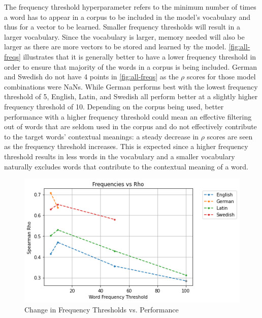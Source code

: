 The frequency threshold hyperparameter refers to the minimum number of times a word has to appear in a corpus to be included in the model’s vocabulary and thus for a vector to be learned. Smaller frequency thresholds will result in a larger vocabulary. Since the vocabulary is larger, memory needed will also be larger as there are more vectors to be stored and learned by the model.  \autoref{fig:all-freqs} illustrates that it is generally better to have a lower frequency threshold in order to ensure that majority of the words in a corpus is being included. German and Swedish do not have 4 points in \autoref{fig:all-freqs} as the $\rho$ scores for those model combinations were NaNs. While German performs best with the lowest frequency threshold of 5, English, Latin, and Swedish all perform better at a slightly higher frequency threshold of 10. Depending on the corpus being used, better performance with a higher frequency threshold could mean an effective filtering out of words that are seldom used in the corpus and do not effectively contribute to the target words' contextual meanings: a steady decrease in $\rho$ scores are seen as the frequency threshold increases. This is expected since a higher frequency threshold results in less words in the vocabulary and a smaller vocabulary naturally excludes words that contribute to the contextual meaning of a word. 

\begin{figure}[h]
  \centering
  \includegraphics[width=.8\linewidth]{sections/figures/freqs_all.png}
  \caption{Change in Frequency Thresholds vs. Performance}
  \label{fig:all-freqs}
\end{figure}

